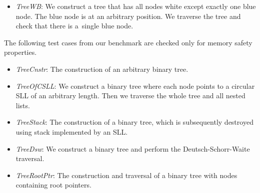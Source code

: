 {\begin{itemize}
    The nodes also need to have parent pointers to allow the transposition.
  \item \emph{TreeWB}: We construct a tree that has all nodes white except exactly one blue node.
    The blue node is at an arbitrary position. We traverse the tree and check
    that there is a~single blue node.
\end{itemize}

The following test cases from our benchmark are checked only for memory safety properties.
\begin{itemize}
	\item \emph{TreeCnstr}: The construction of an arbitrary binary tree.
	\item \emph{TreeOfCSLL}: We construct a binary tree where each node points to a circular SLL
		of an arbitrary length. Then we traverse the whole tree and all nested lists.
	\item \emph{TreeStack}: The construction of a binary tree, which is subsequently destroyed using stack
		implemented by an SLL.
	\item \emph{TreeDsw}: We construct a binary tree and perform the Deutsch-Schorr-Waite traversal.
	\item \emph{TreeRootPtr}: The construction and traversal of a binary tree with nodes containing root pointers.
\end{itemize}



}
